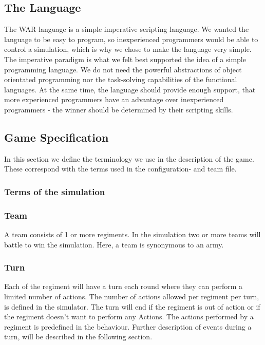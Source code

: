 	\subsection{The Language}
		The WAR language is a simple imperative scripting language. 
		We wanted the language to be easy to program, so inexperienced programmers would be able to control a simulation, which is why we chose to
		make the language very simple. The imperative paradigm is what we felt best supported the idea of a simple programming language. We do not need the
		powerful abstractions of object orientated programming nor the task-solving capabilities of the functional languages. At the same time, the language should provide enough support, that more experienced programmers have an advantage over inexperienced programmers - the winner should be determined by their scripting skills.
		
		 
	\subsection{Game Specification}
	In this section we define the terminology we use in the description of the game. \\
	These correspond with the terms used in the configuration- and team file.
	
		\subsubsection{Terms of the simulation}
		
		\subsubsection{Team}		
		A team consists of 1 or more regiments. In the simulation two or more teams will battle to win the simulation. Here, a team is synonymous to an army.
		
		\subsubsection{Turn}
		Each of the regiment will have a turn each round where they can perform a limited number of actions. The number of actions allowed per regiment per turn, is defined in the simulator.
		The turn will end if the regiment is out of action or if the regiment doesn't want to perform any Actions. 
		The actions performed by a regiment is predefined in the behaviour. 
		Further description of events during a turn, will be described in the following section.
		
